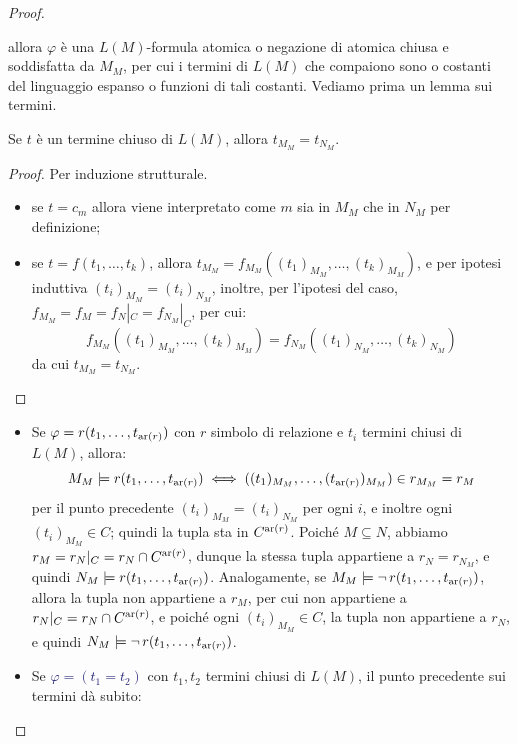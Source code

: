 \begin{proof}
\begin{itemize}
\begin{itemize}
                allora $\varphi$ è una $L(M)$-formula atomica o negazione di atomica chiusa e soddisfatta da $M_M$, per cui i termini di $L(M)$ che compaiono sono o costanti del linguaggio espanso o funzioni di tali costanti. Vediamo prima un lemma sui termini.
                \begin{lemma}
                    Se $t$ è un termine chiuso di $L(M)$, allora $t_{M_M} = t_{N_M}$.
                \end{lemma}
                \begin{proof}
                    Per induzione strutturale.
                    \begin{itemize}[$\bullet$]
                        \item se $t = c_{m}$ allora viene interpretato come $m$ sia in $M_M$ che in $N_M$ per definizione;
                        \item se $t = f(t_1, \ldots, t_k)$, allora $t_{M_M} = f_{M_M}((t_1)_{M_M}, \ldots, (t_k)_{M_M})$, e per ipotesi induttiva $(t_i)_{M_M} = (t_i)_{N_M}$, inoltre, per l'ipotesi del caso, $f_{M_M} = f_M = f_N|_C = f_{N_M}|_C$, per cui:
                        \[ f_{M_M}((t_1)_{M_M}, \ldots, (t_k)_{M_M}) = f_{N_M}((t_1)_{N_M}, \ldots, (t_k)_{N_M}) \]
                         da cui $t_{M_M} = t_{N_M}$.
                    \end{itemize}
                \end{proof}
                \begin{itemize}                    
                    \item Se \textcolor{MidnightBlue}{$\varphi = r(t_1, \ldots, t_{\operatorname{ar}(r)})$} con $r$ simbolo di relazione e $t_i$ termini chiusi di $L(M)$, allora:
                    \[ M_M \models r(t_1, \ldots, t_{\operatorname{ar}(r)}) \iff ((t_1)_{M_M}, \ldots, (t_{\operatorname{ar}(r)})_{M_M}) \in r_{M_M} = r_M \]
                    per il punto precedente $(t_i)_{M_M} = (t_i)_{N_M}$ per ogni $i$, e inoltre ogni $(t_i)_{M_M} \in C$; quindi la tupla sta in $C^{\operatorname{ar}(r)}$. Poiché $M \subseteq N$, abbiamo $r_M = r_N|_C = r_N \cap C^{\operatorname{ar}(r)}$, dunque la stessa tupla appartiene a $r_N = r_{N_M}$, e quindi $N_M \models r(t_1, \ldots, t_{\operatorname{ar}(r)})$.
                    Analogamente, se $M_M \models \neg\, r(t_1, \ldots, t_{\operatorname{ar}(r)})$, allora la tupla non appartiene a $r_M$, per cui non appartiene a $r_N|_C = r_N \cap C^{\operatorname{ar}(r)}$, e poiché ogni $(t_i)_{M_M} \in C$, la tupla non appartiene a $r_N$, e quindi $N_M \models \neg\, r(t_1, \ldots, t_{\operatorname{ar}(r)})$.
                    \item Se \textcolor{MidnightBlue}{$\varphi = (t_1 = t_2)$} con $t_1,t_2$ termini chiusi di $L(M)$, il punto precedente sui termini dà subito:

\end{itemize}
\end{itemize}
\end{itemize}
\end{proof}

